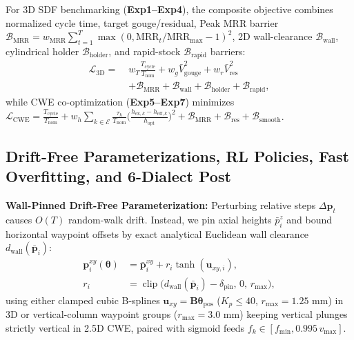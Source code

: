 \documentclass[conference]{IEEEtran}
\begin{document}
For 3D SDF benchmarking (\textbf{Exp1--Exp4}), the composite objective combines normalized cycle time, target gouge/residual, Peak MRR barrier $\mathcal{B}_{\text{MRR}} = w_{\text{MRR}} \sum_{t=1}^T \max(0, \text{MRR}_t / \text{MRR}_{\max} - 1)^2$, 2D wall-clearance $\mathcal{B}_{\text{wall}}$, cylindrical holder $\mathcal{B}_{\text{holder}}$, and rapid-stock $\mathcal{B}_{\text{rapid}}$ barriers:
\begin{equation}
  \begin{aligned}
    \mathcal{L}_{\text{3D}} =\;& w_T \frac{T_{\text{cycle}}}{T_{\text{nom}}} + w_g \bar{V}_{\text{gouge}}^2 + w_r \bar{V}_{\text{res}}^2 \\
    &+ \mathcal{B}_{\text{MRR}} + \mathcal{B}_{\text{wall}} + \mathcal{B}_{\text{holder}} + \mathcal{B}_{\text{rapid}},
  \end{aligned}
  \label{eq:total_loss}
\end{equation}
while CWE co-optimization (\textbf{Exp5--Exp7}) minimizes $\mathcal{L}_{\text{CWE}} = \frac{T_{\text{cycle}}}{T_{\text{nom}}} + w_h \sum_{k \in \mathcal{E}} \frac{\tau_k}{T_{\text{nom}}}\big(\frac{h_{\text{ex},k} - h_{\text{eff},k}}{h_{\text{opt}}}\big)^2 + \mathcal{B}_{\text{MRR}} + \mathcal{B}_{\text{res}} + \mathcal{B}_{\text{smooth}}$.

\subsection{Drift-Free Parameterizations, RL Policies, Fast Overfitting, and 6-Dialect Post}
\label{sec:methods}
\textbf{Wall-Pinned Drift-Free Parameterization:}
Perturbing relative steps $\Delta\mathbf{p}_t$ causes $O(T)$ random-walk drift. Instead, we pin axial heights $\bar{p}_i^z$ and bound horizontal waypoint offsets by exact analytical Euclidean wall clearance $d_{\text{wall}}(\bar{\mathbf{p}}_i)$:
\begin{equation}
  \begin{aligned}
    \mathbf{p}_i^{xy}(\boldsymbol{\theta}) &= \bar{\mathbf{p}}_i^{xy} + r_i \tanh(\mathbf{u}_{xy,i}), \\
    r_i &= \operatorname{clip}\!\big(d_{\text{wall}}(\bar{\mathbf{p}}_i) - \delta_{\text{pin}},\, 0,\, r_{\max}\big),
  \end{aligned}
  \label{eq:joint_spline}
\end{equation}
using either clamped cubic B-splines $\mathbf{u}_{xy} = \mathbf{B}\boldsymbol{\theta}_{\text{pos}}$ ($K_p \le 40$, $r_{\max} = 1.25\text{ mm}$) in 3D or vertical-column waypoint groups ($r_{\max} = 3.0\text{ mm}$) keeping vertical plunges strictly vertical in 2.5D CWE, paired with sigmoid feeds $f_k \in [f_{\min}, 0.995\,v_{\max}]$.
\end{document}
